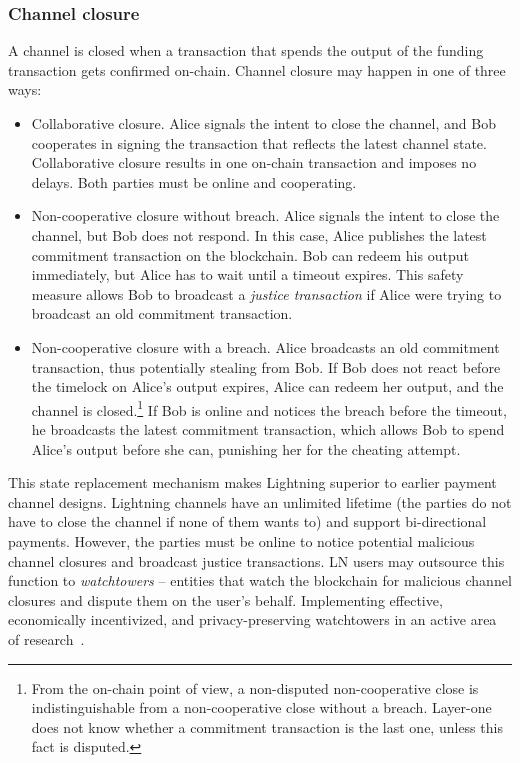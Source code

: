 \subsubsection*{Channel closure}

A channel is closed when a transaction that spends the output of the funding transaction gets confirmed on-chain.
Channel closure may happen in one of three ways:

\begin{itemize}
	\item Collaborative closure. Alice signals the intent to close the channel, and Bob cooperates in signing the transaction that reflects the latest channel state. Collaborative closure results in one on-chain transaction and imposes no delays. Both parties must be online and cooperating.
	\item Non-cooperative closure without breach. Alice signals the intent to close the channel, but Bob does not respond. In this case, Alice publishes the latest commitment transaction on the blockchain. Bob can redeem his output immediately, but Alice has to wait until a timeout expires. This safety measure allows Bob to broadcast a \textit{justice transaction} if Alice were trying to broadcast an old commitment transaction.
	\item Non-cooperative closure with a breach. Alice broadcasts an old commitment transaction, thus potentially stealing from Bob. If Bob does not react before the timelock on Alice's output expires, Alice can redeem her output, and the channel is closed.\footnote{From the on-chain point of view, a non-disputed non-cooperative close is indistinguishable from a non-cooperative close without a breach. Layer-one does not know whether a commitment transaction is the last one, unless this fact is disputed.} If Bob is online and notices the breach before the timeout, he broadcasts the latest commitment transaction, which allows Bob to spend Alice's output before she can, punishing her for the cheating attempt.
\end{itemize}

This state replacement mechanism makes Lightning superior to earlier payment channel designs.
Lightning channels have an unlimited lifetime (the parties do not have to close the channel if none of them wants to) and support bi-directional payments.
However, the parties must be online to notice potential malicious channel closures and broadcast justice transactions.
LN users may outsource this function to \textit{watchtowers} -- entities that watch the blockchain for malicious channel closures and dispute them on the user's behalf.
Implementing effective, economically incentivized, and privacy-preserving watchtowers in an active area of research~\cite{McCorry2019}.

